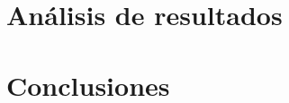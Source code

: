 \documentclass{article}
\begin{document}

\tableofcontents
\newpage












\section{Análisis de resultados}

\section{Conclusiones}


\end{document}
